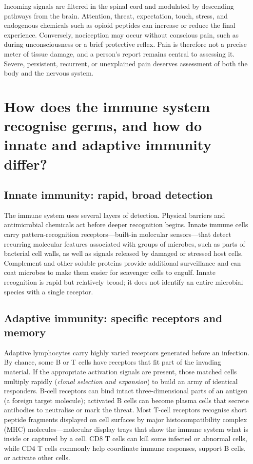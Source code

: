 \documentclass[11pt,oneside]{report}
\begin{document}
Incoming signals are filtered in the spinal cord and modulated by descending
pathways from the brain. Attention, threat, expectation, touch, stress, and
endogenous chemicals such as opioid peptides can increase or reduce the final
experience. Conversely, nociception may occur without conscious pain, such as
during unconsciousness or a brief protective reflex. Pain is therefore not a
precise meter of tissue damage, and a person's report remains central to
assessing it. Severe, persistent, recurrent, or unexplained pain deserves
assessment of both the body and the nervous system.

\section{How does the immune system recognise germs, and how do innate and adaptive immunity differ?}

\subsection*{Innate immunity: rapid, broad detection}

The immune system uses several layers of detection. Physical barriers and
antimicrobial chemicals act before deeper recognition begins. Innate immune
cells carry pattern-recognition receptors—built-in molecular sensors—that
detect recurring molecular features associated with groups of microbes, such as
parts of bacterial cell walls, as well as signals released by damaged or
stressed host cells. Complement and other soluble proteins provide additional
surveillance and can coat microbes to make them easier for scavenger cells to
engulf. Innate recognition is rapid but relatively broad; it does not identify
an entire microbial species with a single receptor.

\subsection*{Adaptive immunity: specific receptors and memory}

Adaptive lymphocytes carry highly varied receptors generated before an
infection. By chance, some B or T cells have receptors that fit part of the
invading material. If the appropriate activation signals are present, those
matched cells multiply rapidly (\emph{clonal selection and expansion}) to build
an army of identical responders. B-cell receptors can bind intact
three-dimensional parts of an antigen (a foreign target molecule); activated B
cells can become plasma cells that secrete antibodies to neutralise or mark the
threat. Most T-cell receptors recognise short peptide fragments displayed on
cell surfaces by major histocompatibility complex (MHC) molecules—molecular
display trays that show the immune system what is inside or captured by a cell.
CD8 T cells can kill some infected or abnormal cells, while CD4 T cells
commonly help coordinate immune responses, support B cells, or activate other
cells.
\end{document}
